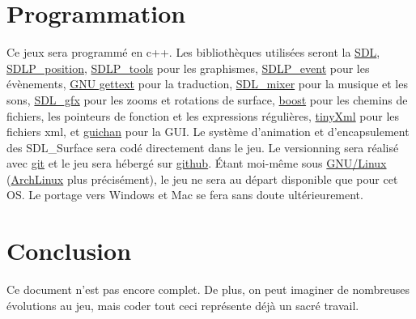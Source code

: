 \documentclass{article}
\begin{document}
\section{Programmation}
Ce jeux sera programmé en c++. Les bibliothèques utilisées seront la \href{http://www.libsdl.org/}{SDL}, \href{https://github.com/lucas8/SDLP\_position}{SDLP\_position}, \href{https://github.com/lucas8/SDLP\_tools}{SDLP\_tools} pour les graphismes, 
\href{https://github.com/lucas8/SDLP\_event}{SDLP\_event} pour les évènements, 
\href{http://www.gnu.org/software/gettext/}{GNU gettext} pour la traduction, 
\href{http://www.libsdl.org/projects/SDL\_mixer/}{SDL\_mixer} pour la musique et les sons, 
\href{http://www.ferzkopp.net/joomla/content/view/19/14/}{SDL\_gfx} pour les zooms et rotations de surface,
\href{http://www.boost.org/}{boost} pour les chemins de fichiers, les pointeurs de fonction et les expressions régulières, 
\href{http://www.grinninglizard.com/tinyxml/index.html}{tinyXml} pour les fichiers xml, 
et \href{http://guichan.sourceforge.net/wiki/index.php/Main\_Page}{guichan} pour la GUI. Le système d'animation et d'encapsulement des SDL\_Surface sera codé directement dans le jeu. Le versionning sera réalisé avec \href{http://git-scm.com/}{git} et le jeu sera hébergé sur \href{https://github.com/}{github}. Étant moi-même sous \href{https://fr.wikipedia.org/wiki/Linux}{GNU/Linux} (\href{http://www.archlinux.org/}{ArchLinux} plus précisément), le jeu ne sera au départ disponible que pour cet OS. Le portage vers Windows et Mac se fera sans doute ultérieurement.

\section{Conclusion}
Ce document n'est pas encore complet. De plus, on peut imaginer de nombreuses évolutions au jeu, mais coder tout ceci représente déjà un sacré travail.
\end{document}
